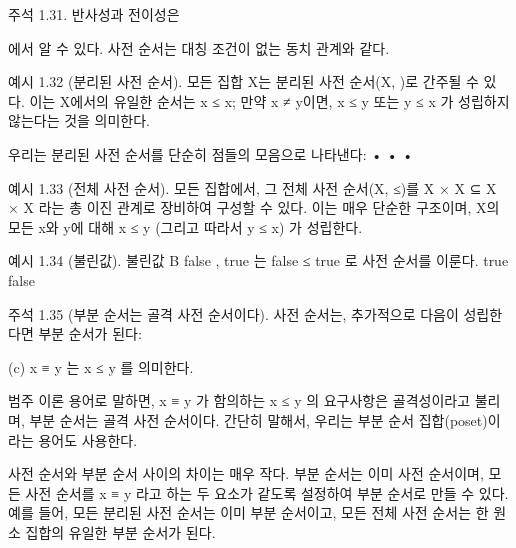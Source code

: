 \documentclass[11pt, a4paper, twoside, openany]{book}
\begin{document}
\par\medskip
주석 1.31. 반사성과 전이성은 
\begin{definitionbox}[정의 1.18]
\hspace{0pt}에서 알 수 있다. 사전 순서는 대칭 조건이 없는 동치 관계와 같다.
\end{definitionbox}

\par\medskip
예시 1.32 (분리된 사전 순서). 모든 집합 X\hspace{0pt}는 분리된 사전 순서(X, )로 간주될 수 있다. 이는 X\hspace{0pt}에서의 유일한 순서는 x ≤ x; 만약 x ≠ y\hspace{0pt}이면,  x ≤ y 또는 y ≤ x 가 성립하지 않는다는 것을 의미한다.

\par\medskip
우리는 분리된 사전 순서를 단순히 점들의 모음으로 나타낸다:
•
•
•

\par\medskip
예시 1.33 (전체 사전 순서). 모든 집합에서, 그 전체 사전 순서(X, ≤)를 X × X ⊆ X × X 라는 총 이진 관계로 장비하여 구성할 수 있다.  이는 매우 단순한 구조이며, X\hspace{0pt}의 모든 x\hspace{0pt}와 y\hspace{0pt}에 대해 x ≤ y (그리고 따라서 y ≤ x) 가 성립한다.

\par\medskip
예시 1.34 (불린값). 불린값 B { false , true } 는 false ≤ true 로 사전 순서를 이룬다.
true
false

\par\medskip
주석 1.35 (부분 순서는 골격 사전 순서이다). 사전 순서는, 추가적으로 다음이 성립한다면 부분 순서가 된다:

\par\medskip
(c) x ≡ y 는 x ≤ y 를 의미한다.

\par\medskip
범주 이론 용어로 말하면, x ≡ y 가 함의하는 x ≤ y 의 요구사항은 골격성이라고 불리며, 부분 순서는 골격 사전 순서이다. 간단히 말해서, 우리는 부분 순서 집합(poset)이라는 용어도 사용한다.

\par\medskip
사전 순서와 부분 순서 사이의 차이는 매우 작다. 부분 순서는 이미 사전 순서이며, 모든 사전 순서를 x ≡ y 라고 하는 두 요소가 같도록 설정하여 부분 순서로 만들 수 있다. 예를 들어, 모든 분리된 사전 순서는 이미 부분 순서이고, 모든 전체 사전 순서는 한 원소 집합의 유일한 부분 순서가 된다.
\end{document}

